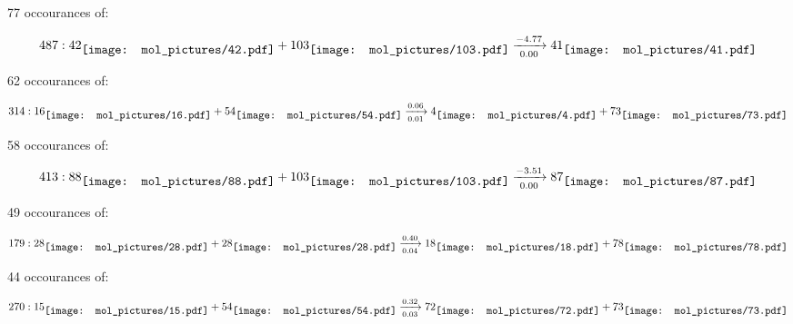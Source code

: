 \documentclass{article}
\begin{document}
\vspace{1cm}


77 occourances of:

$$
487:  
42
\raisebox{-.5\height}{\texttt{[image: mol\_pictures/42.pdf]}}
+
103
\raisebox{-.5\height}{\texttt{[image: mol\_pictures/103.pdf]}}
\xrightarrow[0.00]{-4.77}
41
\raisebox{-.5\height}{\texttt{[image: mol\_pictures/41.pdf]}}
$$



\vspace{1cm}


62 occourances of:

$$
314:  
16
\raisebox{-.5\height}{\texttt{[image: mol\_pictures/16.pdf]}}
+
54
\raisebox{-.5\height}{\texttt{[image: mol\_pictures/54.pdf]}}
\xrightarrow[0.01]{0.06}
4
\raisebox{-.5\height}{\texttt{[image: mol\_pictures/4.pdf]}}
+
73
\raisebox{-.5\height}{\texttt{[image: mol\_pictures/73.pdf]}}
$$



\vspace{1cm}


58 occourances of:

$$
413:  
88
\raisebox{-.5\height}{\texttt{[image: mol\_pictures/88.pdf]}}
+
103
\raisebox{-.5\height}{\texttt{[image: mol\_pictures/103.pdf]}}
\xrightarrow[0.00]{-3.51}
87
\raisebox{-.5\height}{\texttt{[image: mol\_pictures/87.pdf]}}
$$



\vspace{1cm}


49 occourances of:

$$
179:  
28
\raisebox{-.5\height}{\texttt{[image: mol\_pictures/28.pdf]}}
+
28
\raisebox{-.5\height}{\texttt{[image: mol\_pictures/28.pdf]}}
\xrightarrow[0.04]{0.40}
18
\raisebox{-.5\height}{\texttt{[image: mol\_pictures/18.pdf]}}
+
78
\raisebox{-.5\height}{\texttt{[image: mol\_pictures/78.pdf]}}
$$



\vspace{1cm}


44 occourances of:

$$
270:  
15
\raisebox{-.5\height}{\texttt{[image: mol\_pictures/15.pdf]}}
+
54
\raisebox{-.5\height}{\texttt{[image: mol\_pictures/54.pdf]}}
\xrightarrow[0.03]{0.32}
72
\raisebox{-.5\height}{\texttt{[image: mol\_pictures/72.pdf]}}
+
73
\raisebox{-.5\height}{\texttt{[image: mol\_pictures/73.pdf]}}
$$
\end{document}
